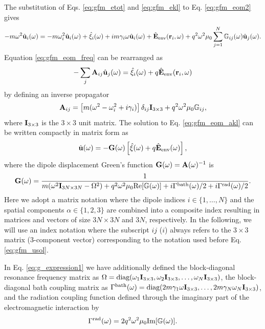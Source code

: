 The substitution of Eqs. \eqref{eq:gfm_etot} and \eqref{eq:gfm_ekl} to Eq. \eqref{eq:gfm_eom2} gives
\begin{equation}
 -m\omega^2 \hat{\mathbf{u}}_i (\omega) =  -m\omega_i^2 \hat {\mathbf{u}}_i(\omega) + \hat{\xi}_i(\omega) + im\gamma_i \omega \hat{\mathbf{u}}_i(\omega) + \hat{\mathbf{E}}_{\textrm{env}}(\mathbf{r}_i,\omega) + q^2\omega^2\mu_0 \sum_{j=1}^N \mathbb{G}_{ij}(\omega) \hat{\mathbf{u}}_j(\omega). \label{eq:gfm_eom_freq}
\end{equation}
Equation \eqref{eq:gfm_eom_freq} can be rearranged as
\begin{equation}
 - \sum_{j} \mathbf{A}_{ij} \hat{\mathbf{u}}_j(\omega) = \hat{\xi}_i(\omega) + q\hat{\mathbf{E}}_{\textrm{env}}(\mathbf{r}_i,\omega) \label{eq:gfm_eom_akl}
\end{equation}
by defining an inverse propagator
\begin{equation}
 \mathbf{A}_{ij} = \left[m(\omega^2-\omega_i^2+i\gamma_i) \right]\delta_{ij}\mathbf{I}_{3\times 3}+ q^2\omega^2\mu_0 \mathbb{G}_{ij},
\end{equation}
where $\mathbf{I}_{3 \times 3}$ is the $3\times 3$ unit matrix. The solution to Eq. \eqref{eq:gfm_eom_akl} can be written compactly in matrix form as
\begin{equation}
 \hat{\mathbf{u}}(\omega) = -\mathbf{G}(\omega) \left[\hat{\xi}(\omega)+q\hat{\mathbf{E}}_{\textrm{env}}(\omega) \right], \label{eq:gfm_usol}
\end{equation}
where the dipole displacement Green's function $\mathbf{G}(\omega)=\mathbf{A}(\omega)^{-1}$ is
\begin{equation}
 \mathbf{G}(\omega) = \frac{1}{m(\omega^2 \mathbf{I}_{3N\times 3N}-\Omega^2)+q^2\omega^2\mu_0 \textrm{Re}[\mathbb{G}(\omega)]+i\Gamma^{\textrm{bath}}(\omega)/2+i\Gamma^{\textrm{rad}}(\omega)/2}. \label{eq:gfm_g_expression1}
\end{equation}
Here we adopt a matrix notation where the dipole indices $i\in \{1,\dots,N\}$ and the spatial components $\alpha\in \{1,2,3\}$ are combined into a composite index resulting in matrices and vectors of size $3N\times 3N$ and $3N$, respectively. In the following, we will use an index notation where the subscript $ij$ ($i$) always refers to the $3\times 3$ matrix (3-component vector) corresponding to the notation used before Eq. \eqref{eq:gfm_usol}.

In Eq. \eqref{eq:g_expression1} we have additionally defined the block-diagonal resonance frequency matrix as $\Omega=\textrm{diag}(\omega_1\mathbf{I}_{3\times 3},\omega_2\mathbf{I}_{3\times 3},\dots,\omega_N\mathbf{I}_{3\times 3})$, the block-diagonal bath coupling matrix as $\Gamma^{\textrm{bath}} (\omega) = \textrm{diag}(2m \gamma_1 \omega\mathbf{I}_{3\times 3},\dots,2m\gamma_N \omega_N \mathbf{I}_{3\times 3})$,
and the radiation coupling function defined through the imaginary part of the electromagnetic interaction by
\begin{equation}
 \Gamma^{\textrm{rad}}(\omega) = 2 q^2\omega^2\mu_0 \textrm{Im}[\mathbb{G}(\omega)]. \label{eq:gfm_gammarad_def}
\end{equation}

